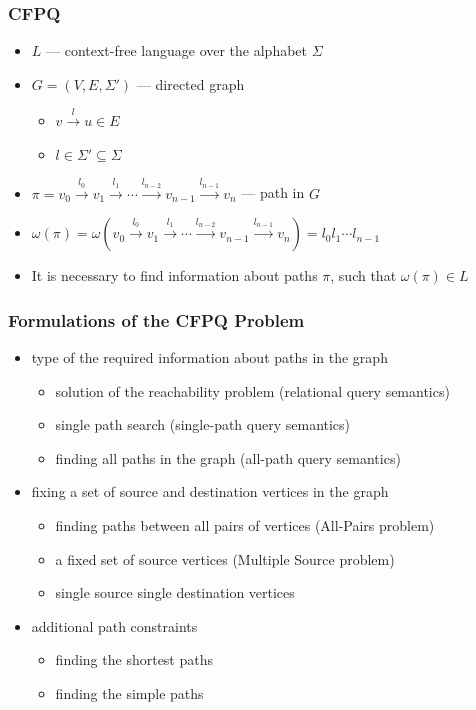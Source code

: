 \documentclass[xcolor=table,aspectratio=169]{beamer}
\begin{document}
\begin{frame}[fragile]
	\frametitle{CFPQ}
	\begin{itemize}
		\item $L$ --- context-free language over the alphabet $\Sigma$
		\pause
		\item $G = (V,E,\Sigma')$ --- directed graph
		\begin{itemize}
			\item $v \xrightarrow{l} u \in E$
			\item $l \in 	\Sigma' \subseteq \Sigma$
		\end{itemize}
		\pause
		\item $\pi = v_0 \xrightarrow{l_0} v_1 \xrightarrow{l_1} \cdots \xrightarrow{l_{n-2}} v_{n-1} \xrightarrow{l_{n-1}} v_n$ --- path in $G$
		\item $\omega(\pi) = \omega(v_0 \xrightarrow{l_0} v_1 \xrightarrow{l_1} \cdots \xrightarrow{l_{n-2}} v_{n-1} \xrightarrow{l_{n-1}} v_n) = l_0 l_1 \cdots l_{n-1}$
		\pause
		\item It is necessary to find information about paths $\pi$, such that $\omega(\pi) \in L$
	\end{itemize}
\end{frame}

\begin{frame}[fragile] \frametitle{Formulations of the CFPQ Problem}
	\begin{itemize}
		\item type of the required information about paths in the graph \begin{itemize}
			\item solution of the reachability problem (relational query semantics)
			\item single path search (single-path query semantics)
			\item finding all paths in the graph (all-path query semantics)
		\end{itemize}
		\item fixing a set of source and destination vertices in the graph
		\begin{itemize}
			\item finding paths between all pairs of vertices (All-Pairs problem)
			\item a fixed set of source vertices (Multiple Source problem)
			\item single source single destination vertices
		\end{itemize}
		\item additional path constraints
		\begin{itemize}
			\item finding the shortest paths
			\item finding the simple paths
		\end{itemize}
	\end{itemize}
\end{frame}
\end{document}
